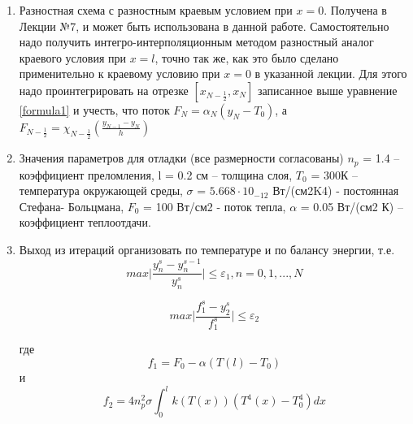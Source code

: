 \begin{enumerate}
\begin{table}[ph!]
\begin{tabular}{|c|c|c|c|c|}
		\end{tabular}
	\end{table}

	\item Разностная схема с разностным краевым условием при $x = 0$. Получена в Лекции №7, и может быть использована в данной работе. Самостоятельно надо получить интегро-интерполяционным методом разностный аналог краевого условия при $x = l$, точно
	так же, как это было сделано применительно к краевому условию при $x = 0$ в указанной 
	лекции. Для этого надо проинтегрировать на отрезке $[x_{N-\frac{1}{2}}, x_N]$ записанное выше уравнение \ref{formula1} и учесть, что поток $F_N = \alpha_N(y_N - T_0)$, а $F_{N - \frac{1}{2}} = \chi_{N - \frac{1}{2}}(\frac{y_{N-1} - y_N}{h})$
	
	\item Значения параметров для отладки (все размерности согласованы)
	$n_p$ = 1.4 – коэффициент преломления,
	l = 0.2 см – толщина слоя,
	$T_0$ = 300К – температура окружающей среды,
	$\sigma$ = $5.668 \cdot 10_{-12}$ Вт/(см2K4) - постоянная Стефана- Больцмана,
	$F_0$ = 100 Вт/см2 - поток тепла,
	$\alpha$ = 0.05 Вт/(см2 К) – коэффициент теплоотдачи. 
	
	\item  Выход из итераций организовать по температуре и по балансу энергии, т.е.
	\begin{equation}\label{formula3}
		max \bigg|\frac{y_n^s - y_n^{s-1}}{y_n^s} \bigg| \leq \varepsilon_1, n = 0, 1, ..., N
	\end{equation}

	\begin{equation}\label{formula4}
		max \bigg|\frac{f_1^s - y_2^s}{f_1^s} \bigg| \leq \varepsilon_2
	\end{equation}
	
	где 
	\begin{equation}\label{formula5}
		f_1 = F_0 - \alpha(T(l) - T_0)
	\end{equation}
	и
	\begin{equation}\label{formula6}
		f_2 = 4n_p^2 \sigma \int_0^l k(T(x))(T^4(x) - T_0^4)dx
	\end{equation}
	
\end{enumerate}


